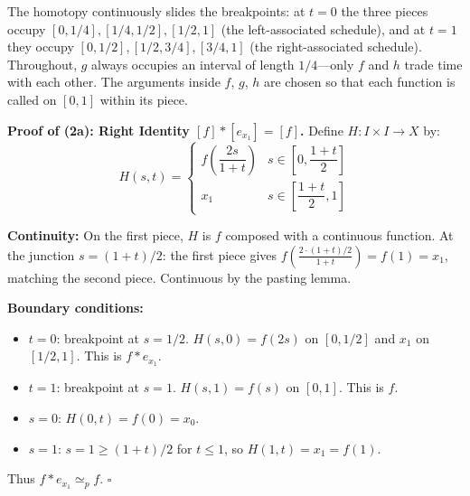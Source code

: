 \documentclass[11pt]{report}
\renewenvironment{proof}[1][Proof]{\noindent\textbf{#1.} }{\hfill$\square$\par\vspace{5pt}}
\begin{document}
\begin{rembox}
The homotopy continuously slides the breakpoints: at $t = 0$ the three pieces occupy $[0, 1/4], [1/4, 1/2], [1/2, 1]$ (the left-associated schedule), and at $t = 1$ they occupy $[0, 1/2], [1/2, 3/4], [3/4, 1]$ (the right-associated schedule). Throughout, $g$ always occupies an interval of length $1/4$---only $f$ and $h$ trade time with each other. The arguments inside $f$, $g$, $h$ are chosen so that each function is called on $[0, 1]$ within its piece.
\end{rembox}

\begin{proof}[{Proof of (2a): Right Identity $[f] * [e_{x_1}] = [f]$}]
Define $H: I \times I \to X$ by:
\[H(s, t) = \begin{cases} f\!\left(\dfrac{2s}{1 + t}\right) & s \in \left[0, \dfrac{1+t}{2}\right] \\[6pt] x_1 & s \in \left[\dfrac{1+t}{2}, 1\right] \end{cases}\]

\textbf{Continuity:} On the first piece, $H$ is $f$ composed with a continuous function. At the junction $s = (1+t)/2$: the first piece gives $f\!\left(\frac{2 \cdot (1+t)/2}{1+t}\right) = f(1) = x_1$, matching the second piece. Continuous by the pasting lemma.

\textbf{Boundary conditions:}
\begin{itemize}[nosep]
    \item $t = 0$: breakpoint at $s = 1/2$. $H(s, 0) = f(2s)$ on $[0, 1/2]$ and $x_1$ on $[1/2, 1]$. This is $f * e_{x_1}$. \checkmark
    \item $t = 1$: breakpoint at $s = 1$. $H(s, 1) = f(s)$ on $[0, 1]$. This is $f$. \checkmark
    \item $s = 0$: $H(0, t) = f(0) = x_0$. \checkmark
    \item $s = 1$: $s = 1 \geq (1+t)/2$ for $t \leq 1$, so $H(1, t) = x_1 = f(1)$. \checkmark
\end{itemize}
Thus $f * e_{x_1} \simeq_p f$.
\end{proof}
\end{document}
